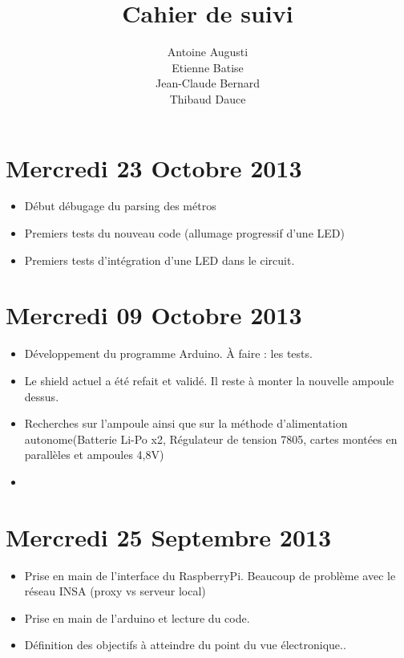 \documentclass[a4paper, 12pt, french]{article}
\title{Cahier de suivi}
\author{Antoine Augusti\\ Etienne Batise\\ Jean-Claude Bernard\\ Thibaud Dauce}
\begin{document}
\maketitle

	\section*{Mercredi 23 Octobre 2013 } %
	\label{sec:mercredi_23_}
	\begin{itemize}
		\item Début débugage du parsing des métros 
		\item Premiers tests du nouveau code (allumage progressif d'une LED)
		\item Premiers tests d'intégration d'une LED dans le circuit.
	\end{itemize}
	

	\section*{Mercredi 09 Octobre 2013} %
	\label{sec:mercredi_09_octobre_2013}
	\begin{itemize}
		\item Développement du programme Arduino. À faire : les tests.
		\item Le shield actuel a été refait et validé. Il reste à monter la nouvelle ampoule dessus.
		\item Recherches sur l'ampoule ainsi que sur la méthode d'alimentation autonome(Batterie Li-Po x2, Régulateur de tension 7805, cartes montées en parallèles et ampoules 4,8V)
		\item
	\end{itemize}

	\section*{Mercredi 25 Septembre 2013} %
	\label{sec:mercredi_25_septembre_2013}
	\begin{itemize}
			\item Prise en main de l'interface du RaspberryPi. Beaucoup de problème avec le réseau INSA (proxy vs serveur local)
			\item Prise en main de l'arduino et lecture du code.
			\item Définition des objectifs à atteindre du point du vue électronique..
	\end{itemize}	
\end{document}
